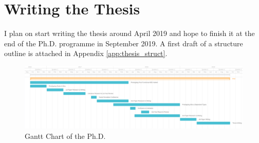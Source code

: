 \section{Writing the Thesis}
I plan on start writing the thesis around April 2019 and hope to finish it at the end of the Ph.D. programme in September 2019. A first draft of a structure outline is attached in Appendix \ref{app:thesis_struct}.

\clearpage

\begin{landscape}
	\centering
	
	\begin{figure}
	\centering
	\includegraphics[width=1.5\textwidth, height=0.8\textwidth, angle=0]{./fig/phd_gantt.png}
	\caption{Gantt Chart of the Ph.D.}
	\label{fig:gantt}
\end{figure}
\end{landscape}